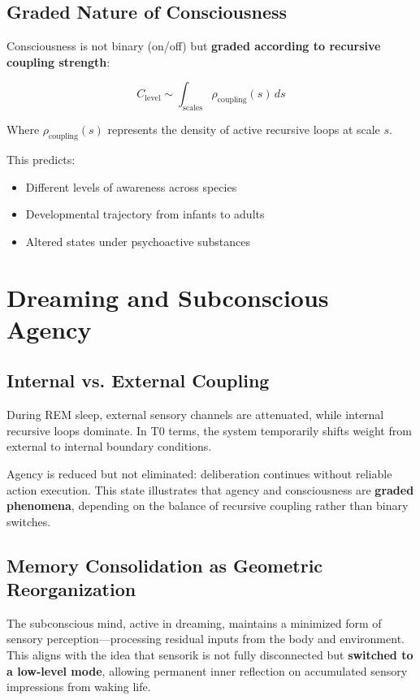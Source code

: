 	\subsection{Graded Nature of Consciousness}
	
	Consciousness is not binary (on/off) but \textbf{graded according to recursive coupling strength}:
	
	\[
	C_{\text{level}} \sim \int_{\text{scales}} \rho_{\text{coupling}}(s) \, ds
	\]
	
	Where $\rho_{\text{coupling}}(s)$ represents the density of active recursive loops at scale $s$.
	
	This predicts:
	\begin{itemize}
		\item Different levels of awareness across species
		\item Developmental trajectory from infants to adults
		\item Altered states under psychoactive substances
	\end{itemize}
	
	\section{Dreaming and Subconscious Agency}
	
	\subsection{Internal vs. External Coupling}
	
	During REM sleep, external sensory channels are attenuated, while internal recursive loops dominate. In T0 terms, the system temporarily shifts weight from external to internal boundary conditions.
	
	Agency is reduced but not eliminated: deliberation continues without reliable action execution. This state illustrates that agency and consciousness are \textbf{graded phenomena}, depending on the balance of recursive coupling rather than binary switches.
	
	\subsection{Memory Consolidation as Geometric Reorganization}
	
	The subconscious mind, active in dreaming, maintains a minimized form of sensory perception—processing residual inputs from the body and environment. This aligns with the idea that sensorik is not fully disconnected but \textbf{switched to a low-level mode}, allowing permanent inner reflection on accumulated sensory impressions from waking life.
	
